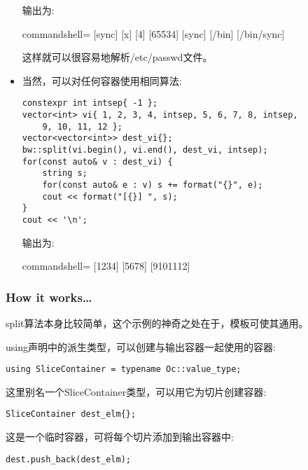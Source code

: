 \begin{itemize}
输出为:

\begin{tcblisting}{commandshell={}}
[sync] [x] [4] [65534] [sync] [/bin] [/bin/sync]
\end{tcblisting}

这样就可以很容易地解析/etc/passwd文件。

\item 
当然，可以对任何容器使用相同算法:

\begin{lstlisting}[style=styleCXX]
constexpr int intsep{ -1 };
vector<int> vi{ 1, 2, 3, 4, intsep, 5, 6, 7, 8, intsep,
	9, 10, 11, 12 };
vector<vector<int>> dest_vi{};
bw::split(vi.begin(), vi.end(), dest_vi, intsep);
for(const auto& v : dest_vi) {
	string s;
	for(const auto& e : v) s += format("{}", e);
	cout << format("[{}] ", s);
}
cout << '\n';
\end{lstlisting}

输出为:

\begin{tcblisting}{commandshell={}}
[1234] [5678] [9101112]
\end{tcblisting}
\end{itemize}

\subsubsection{How it works…}

split算法本身比较简单，这个示例的神奇之处在于，模板可使其通用。

using声明中的派生类型，可以创建与输出容器一起使用的容器:

\begin{lstlisting}[style=styleCXX]
using SliceContainer = typename Oc::value_type;
\end{lstlisting}

这里别名一个SliceContainer类型，可以用它为切片创建容器:

\begin{lstlisting}[style=styleCXX]
SliceContainer dest_elm{};
\end{lstlisting}

这是一个临时容器，可将每个切片添加到输出容器中:

\begin{lstlisting}[style=styleCXX]
dest.push_back(dest_elm);
\end{lstlisting}









